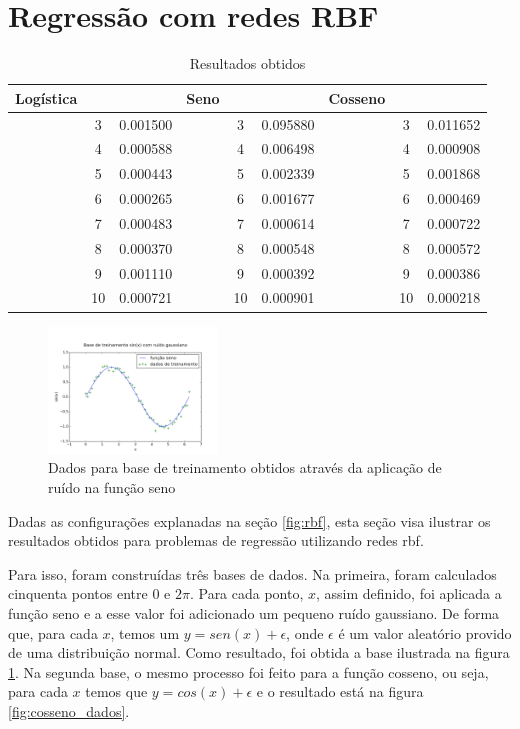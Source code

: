 \documentclass[conference]{IEEEtran}
\begin{document}
\section{Regressão com redes RBF}
\label{resultados}

\begin{table}[t]
	\centering
	\caption{Resultados obtidos}
	\label{tbl:resultados}
	\begin{tabular}{l c c l c c l c c}
		\toprule
		Logística & & & Seno & & & Cosseno & & \\
		\midrule
		{} & 3 & 0.001500 & {} & 3 & 0.095880 & {} & 3 & 0.011652 \\
		{} & 4 & 0.000588 & {} & 4 & 0.006498 & {} & 4 & 0.000908 \\
		{} & 5 & 0.000443 & {} & 5 & 0.002339 & {} & 5 & 0.001868 \\
		{} & 6 & 0.000265 & {} & 6 & 0.001677 & {} & 6 & 0.000469 \\
		{} & 7 & 0.000483 & {} & 7 & 0.000614 & {} & 7 & 0.000722 \\
		{} & 8 & 0.000370 & {} & 8 & 0.000548 & {} & 8 & 0.000572 \\
		{} & 9 & 0.001110 & {} & 9 & 0.000392 & {} & 9 & 0.000386 \\
		{} & 10 & 0.000721 & {} & 10 & 0.000901 & {} & 10 & 0.000218 \\
		\bottomrule
	\end{tabular}
\end{table}


\begin{figure}[b]
	\caption{Dados para base de treinamento obtidos através da aplicação de 
		ruído na função seno}
	\label{fig:seno_dados}
	\centering
	\includegraphics[width=0.40\textwidth]{sin_5v1_train_data_paper}
\end{figure}

Dadas as configurações explanadas na seção \ref{fig:rbf}, esta seção visa 
ilustrar os resultados obtidos para problemas de regressão utilizando redes 
\ac*{rbf}.

Para isso, foram construídas três bases de dados. Na primeira, foram 
calculados cinquenta pontos entre $0$ e $2\pi$. Para cada ponto, $x$, assim 
definido, foi aplicada a função seno e a esse valor foi adicionado um pequeno 
ruído gaussiano. De forma que, para cada $x$, temos um $y = sen(x) + 
\epsilon$, onde $\epsilon$ é um valor aleatório provido de uma distribuição 
normal. Como resultado, foi obtida a base ilustrada na figura 
\ref{fig:seno_dados}. Na segunda base, o mesmo processo foi feito para a função 
cosseno, ou seja, para cada $x$ temos que $y = cos(x) + \epsilon$ e o 
resultado está na figura \ref{fig:cosseno_dados}.
\end{document}
